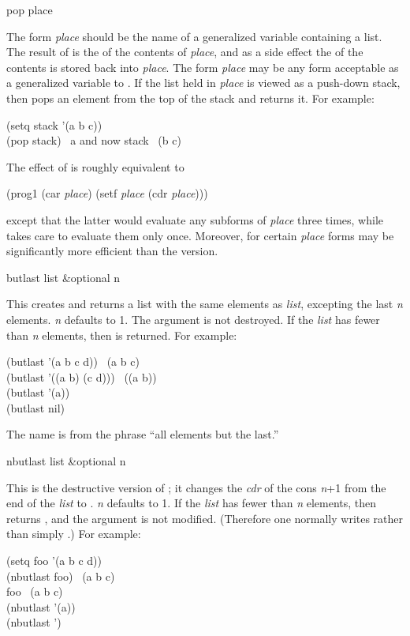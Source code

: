 \begin{defmac}
pop place

The form \emph{place} should be the name of a generalized variable
containing a list.  The result of  is the  of the contents
of \emph{place}, and as a side effect the  of the contents is stored
back into \emph{place}.  The form \emph{place} may be any form acceptable as a
generalized variable to .  If the list held in \emph{place} is
viewed as a push-down stack, then  pops an element from the top of
the stack and returns it.
For example:
\begin{lisp}
(setq stack '(a b c)) \\
(pop stack) \EV\ a  \textrm{and now} stack \EV\ (b c)
\end{lisp}
The effect of  is roughly equivalent to
\begin{lisp}
(prog1 (car \emph{place}) (setf \emph{place} (cdr \emph{place})))
\end{lisp}
except that the latter would evaluate any subforms of \emph{place}
three times, while  takes care to evaluate them only once.
Moreover, for certain \emph{place} forms  may be
significantly more efficient than the  version.
\end{defmac}

\begin{defun}[Function]
butlast list &optional n

This creates and returns a list with the same elements as \emph{list},
excepting the last \emph{n} elements.
\emph{n} defaults to 1.  The argument is not destroyed.
If the \emph{list} has fewer than \emph{n} elements, then {\emptylist} is returned.
For example:
\begin{lisp}
(butlast '(a b c d)) \EV\ (a b c) \\
(butlast '((a b) (c d))) \EV\ ((a b)) \\
(butlast '(a)) \EV\ {\emptylist} \\
(butlast nil) \EV\ {\emptylist}
\end{lisp}
The name is from the phrase ``all elements but the last.''
\end{defun}

\begin{defun}[Function]
nbutlast list &optional n

This is the destructive version of ; it changes the \emph{cdr} of
the cons \emph{n}+1 from the end of the \emph{list} to {\nil}.  \emph{n} defaults to 1.
If the \emph{list} has fewer than \emph{n} elements, then 
returns {\emptylist}, and the argument is not modified.  (Therefore
one normally writes  rather than simply
.)
For example:
\begin{lisp}
(setq foo '(a b c d)) \\
(nbutlast foo) \EV\ (a b c) \\
foo \EV\ (a b c) \\
(nbutlast '(a)) \EV\ {\emptylist} \\
(nbutlast '{\nil}) \EV\ {\emptylist}
\end{lisp}
\end{defun}

